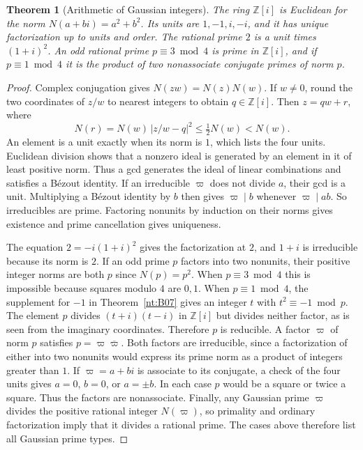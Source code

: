 \documentclass[11pt,oneside,openany]{book}
\theoremstyle{plain}
\newtheorem{theorem}{Theorem}[chapter]
\theoremstyle{definition}
\theoremstyle{remark}
\begin{document}
\begin{theorem}[Arithmetic of Gaussian integers]\label{nt:D03}
The ring \(\mathbb Z[i]\) is Euclidean for the norm
\(N(a+bi)=a^2+b^2\). Its units are \(1,-1,i,-i\), and it has unique
factorization up to units and order. The rational prime \(2\) is a
unit times \((1+i)^2\). An odd rational prime \(p\equiv3\bmod4\)
is prime in \(\mathbb Z[i]\), and if \(p\equiv1\bmod4\) it is the
product of two nonassociate conjugate primes of norm \(p\).
\end{theorem}
\begin{proof}
Complex conjugation gives \(N(zw)=N(z)N(w)\). If \(w\ne0\), round the
two coordinates of \(z/w\) to nearest integers to obtain \(q\in\mathbb
Z[i]\). Then \(z=qw+r\), where
\[
 N(r)=N(w)\,|z/w-q|^2\le\tfrac12N(w)<N(w).
\]
An element is a unit exactly when its norm is \(1\), which lists the
four units. Euclidean division shows that a nonzero ideal is generated
by an element in it of least positive norm. Thus a gcd generates the
ideal of linear combinations and satisfies a B\'ezout identity.
If an irreducible \(\varpi\) does not divide \(a\), their gcd is a unit.
Multiplying a B\'ezout identity by \(b\) then gives
\(\varpi\mid b\) whenever \(\varpi\mid ab\). So irreducibles are
prime. Factoring nonunits by induction on their norms gives existence
and prime cancellation gives uniqueness.

The equation \(2=-i(1+i)^2\) gives the factorization at \(2\), and
\(1+i\) is irreducible because its norm is \(2\). If an odd prime \(p\)
factors into two nonunits, their positive integer norms are both \(p\)
since \(N(p)=p^2\). When \(p\equiv3\bmod4\) this is impossible because
squares modulo \(4\) are \(0,1\). When \(p\equiv1\bmod4\), the
supplement for \(-1\) in Theorem~\ref{nt:B07} gives an integer \(t\)
with \(t^2\equiv-1\bmod p\). The element \(p\) divides
\((t+i)(t-i)\) in \(\mathbb Z[i]\) but divides neither factor, as is
seen from the imaginary coordinates. Therefore \(p\) is reducible.
A factor \(\varpi\) of norm \(p\) satisfies \(p=\varpi\overline\varpi\).
Both factors are irreducible, since a factorization of either into
two nonunits would express its prime norm as a product of integers
greater than \(1\).
If \(\varpi=a+bi\) is associate to its conjugate, a check of the four
units gives \(a=0\), \(b=0\), or \(a=\pm b\). In each case \(p\)
would be a square or twice a square. Thus the factors are nonassociate.
Finally, any Gaussian prime \(\varpi\) divides the positive rational
integer \(N(\varpi)\), so primality and ordinary factorization imply
that it divides a rational prime. The cases above therefore list all
Gaussian prime types.
\end{proof}
\end{document}
